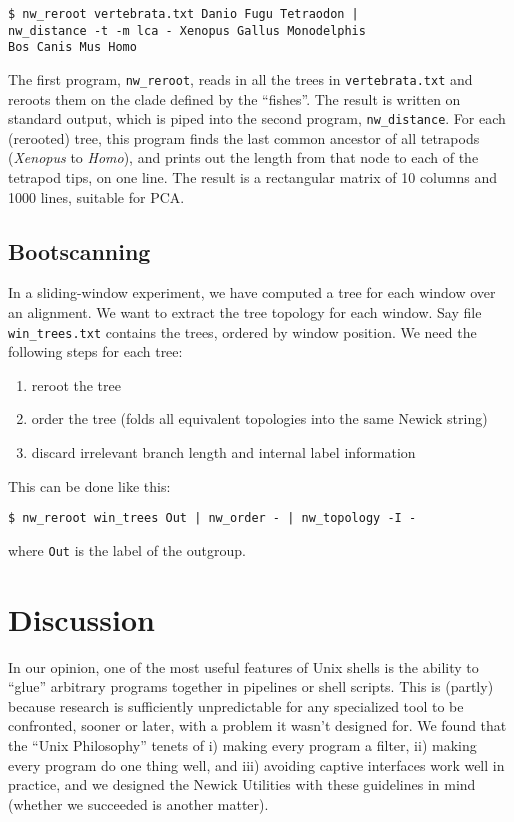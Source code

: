 \documentclass[a4paper,11pt]{article}
\newcommand{\prog}[1]{\texttt{nw\_#1}}
\begin{document}
\begin{verbatim}
$ nw_reroot vertebrata.txt Danio Fugu Tetraodon | 
nw_distance -t -m lca - Xenopus Gallus Monodelphis
Bos Canis Mus Homo 
\end{verbatim}

The first program, \prog{reroot}, reads in all the trees in \texttt{vertebrata.txt} and reroots them on the clade defined by the ``fishes''. The result is written on standard output, which is piped into the second program, \prog{distance}. For each (rerooted) tree, this program finds the last common ancestor of all tetrapods (\textit{Xenopus} to \textit{Homo}), and prints out the length from that node to each of the tetrapod tips, on one line. The result is a rectangular matrix of 10 columns and 1000 lines, suitable for \textsc{PCA}.

\subsection*{Bootscanning}

In a sliding-window experiment, we have computed a tree for each window over an alignment. We want to extract the tree topology for each window. Say file \texttt{win\_trees.txt} contains the trees, ordered by window position. We need the following steps for each tree:
\begin{enumerate}
 \item reroot the tree
 \item order the tree (folds all equivalent topologies into the same Newick string)
 \item discard irrelevant branch length and internal label information
\end{enumerate}
This can be done like this:
\begin{verbatim}
$ nw_reroot win_trees Out | nw_order - | nw_topology -I -
\end{verbatim}
where \verb|Out| is the label of the outgroup.


\section*{Discussion}

In our opinion, one of the most useful features of Unix shells is the ability to  ``glue'' arbitrary programs together in pipelines or shell scripts. This is (partly) because research is sufficiently unpredictable for any specialized tool to be confronted, sooner or later, with a problem it wasn't designed for. We found that the ``Unix Philosophy'' tenets of i) making every program a filter, ii) making every program do one thing well, and iii) avoiding captive interfaces work well in practice, and we designed the Newick Utilities with these guidelines in mind (whether we succeeded is another matter).

 

\end{document}
